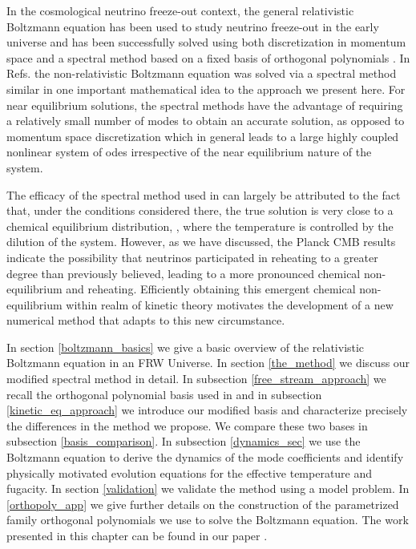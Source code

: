 In the cosmological neutrino freeze-out context, the general relativistic Boltzmann equation has been used to study neutrino freeze-out in the early universe and has been successfully solved using both discretization in momentum space \cite{Madsen,Dolgov_Hansen,Gnedin,Mangano2005} and a spectral method based on a fixed basis of orthogonal polynomials \cite{Esposito2000,Mangano2002}.    In Refs.\cite{Wilkening,Wilkening2} the non-relativistic Boltzmann equation was solved via a spectral method similar in  one important mathematical idea to the approach we present here.  For near equilibrium solutions, the spectral methods have the advantage of requiring a relatively small number of modes to obtain an accurate solution, as opposed to momentum space discretization which in general leads to a large highly coupled nonlinear system of odes irrespective of the near equilibrium nature of the system.  

The efficacy of the spectral method used in \cite{Esposito2000,Mangano2002} can largely be attributed to the fact that, under the conditions considered there, the true solution is very close to a chemical equilibrium distribution, , where the temperature is controlled by the dilution of the system. However, as we have discussed, the Planck CMB results \cite{Planck} indicate the possibility that neutrinos participated in reheating to a greater degree than previously believed, leading to a more pronounced chemical non-equilibrium and reheating. Efficiently obtaining this emergent chemical non-equilibrium within realm of kinetic theory motivates the development of a new numerical method that adapts to this new circumstance.

In section \ref{boltzmann_basics} we give a basic overview of the relativistic Boltzmann equation in an FRW Universe.  In section \ref{the_method} we discuss our modified spectral method in detail.  In subsection \ref{free_stream_approach} we recall the orthogonal polynomial basis used in \cite{Esposito2000,Mangano2002} and in subsection \ref{kinetic_eq_approach} we introduce our modified basis and characterize precisely the differences in the method  we propose. We compare these two bases in subsection \ref{basis_comparison}. In subsection \ref{dynamics_sec} we use the Boltzmann equation to derive the dynamics of the mode coefficients and identify physically motivated evolution equations for the effective temperature and fugacity.  In section \ref{validation} we validate the method using a model problem.  In  \ref{orthopoly_app} we give further details on the construction of the parametrized family orthogonal polynomials we use to solve the Boltzmann equation.  The work presented in this chapter can be found in our paper \cite{Birrell_orthopoly}.


